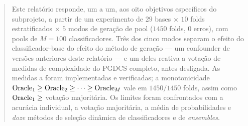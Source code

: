 \begin{abstract}
\noindent
Este relatório responde, um a um, aos oito objetivos específicos do subprojeto, a
partir de um experimento de $29$ bases $\times$ $10$ folds estratificados $\times$
$5$ modos de geração de pool ($1450$ folds, $0$ erros), com pools de $M=100$
classificadores. Três dos cinco modos separam o efeito do classificador-base do
efeito do método de geração --- um confounder de versões anteriores deste relatório
--- e um deles reativa a votação de medidas de complexidade do PGDCS completo,
antes desligada. As medidas  a  foram implementadas e verificadas; a
monotonicidade $\On{1}\ge\On{2}\ge\dots\ge\On{M}$ vale em $1450/1450$ folds, assim
como $\On{1}\ge$ votação majoritária. Os limites foram confrontados com a acurácia
individual, a votação majoritária, a média de probabilidades e \emph{doze} métodos
de seleção dinâmica de classificadores e de \emph{ensembles}.


\end{abstract}
